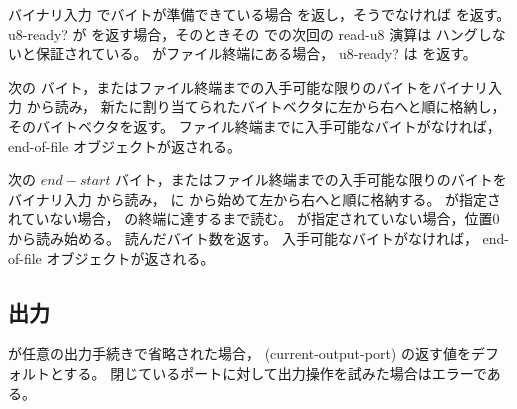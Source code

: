 \begin{entry}{%
}

バイナリ入力  でバイトが準備できている場合 \schtrue{} を返し，そうでなければ \schfalse{} を返す。
{\cf u8-ready?} が \schtrue{} を返す場合，そのときその  での次回の {\cf read-u8} 演算は
ハングしないと保証されている。
 がファイル終端にある場合， {\cf u8-ready?} は \schtrue を返す。

\end{entry}

\begin{entry}{%
}

次の  バイト，またはファイル終端までの入手可能な限りのバイトをバイナリ入力  から読み，
新たに割り当てられたバイトベクタに左から右へと順に格納し，そのバイトベクタを返す。
ファイル終端までに入手可能なバイトがなければ， end-of-file オブジェクトが返される。

\end{entry}

\begin{entry}{%
}

次の $end - start$ バイト，またはファイル終端までの入手可能な限りのバイトを バイナリ入力  から読み，
 に  から始めて左から右へと順に格納する。
 が指定されていない場合，  の終端に達するまで読む。
 が指定されていない場合，位置0から読み始める。
読んだバイト数を返す。
入手可能なバイトがなければ， end-of-file オブジェクトが返される。

\end{entry}


\subsection{出力}
\label{outputsection}

 が任意の出力手続きで省略された場合， {\cf (current-output-port)} の返す値をデフォルトとする。
閉じているポートに対して出力操作を試みた場合はエラーである。

\noindent \hbox{}
\vspace{-5ex}

